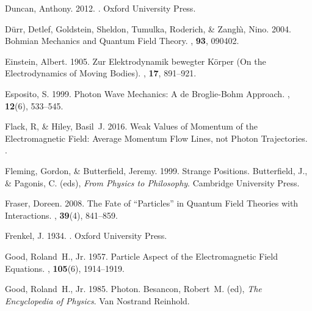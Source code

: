 \documentclass[12pt,secnumarabic,amsmath,amssymb,balancelastpage,nofootinbib]{article}
\begin{document}
\begin{thebibliography}{}
Duncan, Anthony. 2012.
.
\newblock Oxford University Press.

D\"urr, Detlef, Goldstein, Sheldon, Tumulka, Roderich, \& Zangh\`{\i}, Nino.
  2004.
\newblock Bohmian Mechanics and Quantum Field Theory.
, {\bf 93}, 090402.

Einstein, Albert. 1905.
\newblock Zur Elektrodynamik bewegter K\"{o}rper (On the Electrodynamics of
  Moving Bodies).
, {\bf 17}, 891--921.

Esposito, S. 1999.
\newblock Photon Wave Mechanics: A de Broglie-Bohm Approach.
, {\bf 12}(6), 533--545.

Flack, R, \& Hiley, Basil~J. 2016.
\newblock Weak Values of Momentum of the Electromagnetic Field: Average
  Momentum Flow Lines, not Photon Trajectories.
.

Fleming, Gordon, \& Butterfield, Jeremy. 1999.
\newblock Strange Positions.
 Butterfield, J., \& Pagonis, C. (eds), {\em
  From Physics to Philosophy}.
\newblock Cambridge University Press.

Fraser, Doreen. 2008.
\newblock The Fate of ``Particles'' in Quantum Field Theories with
  Interactions.
, {\bf
  39}(4), 841--859.

Frenkel, J. 1934.
.
\newblock Oxford University Press.

Good, Roland~H., Jr. 1957.
\newblock Particle Aspect of the Electromagnetic Field Equations.
, {\bf 105}(6), 1914--1919.

Good, Roland~H., Jr. 1985.
\newblock Photon.
 Besancon, Robert~M. (ed), {\em The
  Encyclopedia of Physics}.
\newblock Van Nostrand Reinhold.


\end{thebibliography}
\end{document}
